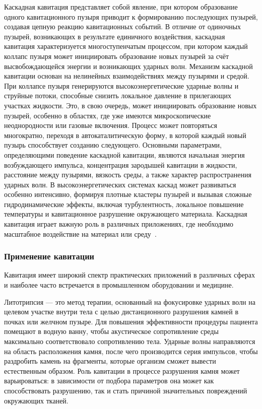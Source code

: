 Каскадная кавитация представляет собой явление, при котором образование одного кавитационного пузыря приводит к формированию последующих пузырей, создавая цепную реакцию кавитационных событий.
В отличие от одиночных пузырей, возникающих в результате единичного воздействия, каскадная кавитация характеризуется многоступенчатым процессом, при котором каждый коллапс пузыря может инициировать образование новых пузырей за счёт высвобождающейся энергии и возникающих ударных волн.
Механизм каскадной кавитации основан на нелинейных взаимодействиях между пузырями и средой. 
При коллапсе пузыря генерируются высокоэнергетические ударные волны и струйные потоки, способные снизить локальное давление в прилегающих участках жидкости. 
Это, в свою очередь, может инициировать образование новых пузырей, особенно в областях, где уже имеются микроскопические неоднородности или газовые включения. 
Процесс может повторяться многократно, переходя в автокаталитическую форму, в которой каждый новый пузырь способствует созданию следующего.
Основными параметрами, определяющими поведение каскадной кавитации, являются начальная энергия возбуждающего импульса, концентрация зародышей кавитации в жидкости, расстояние между пузырями, вязкость среды, а также характер распространения ударных волн. 
В высокоэнергетических системах каскад может развиваться особенно интенсивно, формируя плотные кластеры пузырей и вызывая сложные гидродинамические эффекты, включая турбулентность, локальное повышение температуры и кавитационное разрушение окружающего материала.
Каскадная кавитация играет важную роль в различных приложениях, где необходимо масштабное воздействие на материал или среду~\cite{10.1016/j.ultsonch.2025.107295, 10.1016/j.ultsonch.2004.01.006}.

\vspace{0.5\baselineskip}
\subsubsection{Применение кавитации}
\vspace{0.5\baselineskip}

Кавитация имеет широкий спектр практических приложений в различных сферах и наиболее часто встречается в промышленном оборудовании и медицине.

Литотрипсия — это метод терапии, основанный на фокусировке ударных волн на целевом участке внутри тела с целью дистанционного разрушения камней в почках или желчном пузыре. Для повышения эффективности процедуры пациента помещают в водную ванну, чтобы акустическое сопротивление среды максимально соответствовало сопротивлению тела. Ударные волны направляются на область расположения камня, после чего производится серия импульсов, чтобы раздробить камень на фрагменты, которые организм сможет вывести естественным образом. 
Роль кавитации в процессе разрушения камня может варьироваться: в зависимости от подбора параметров она может как способствовать разрушению, так и стать причиной значительных повреждений окружающих тканей.~\cite{10.1134/1.1591291, 10.1016/0301-5629(87)90076-7, 10.1016/s0140-6736(80)92335-1}

